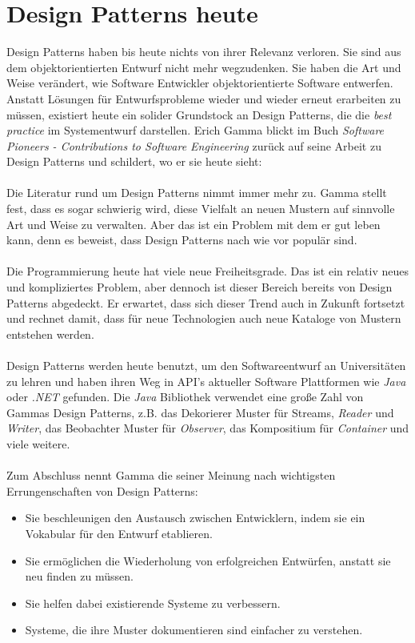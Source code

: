 \documentclass[fontsize=11pt,a4paper,final]{scrreprt}[2003/01/01]
\begin{document}
\chapter{Design Patterns heute}\label{se:Design Patterns heute}
Design Patterns haben bis heute nichts von ihrer Relevanz verloren. Sie sind aus dem objektorientierten Entwurf nicht mehr wegzudenken. Sie haben die Art und Weise verändert, wie Software Entwickler objektorientierte Software entwerfen. Anstatt Lösungen für Entwurfsprobleme wieder und wieder erneut erarbeiten zu müssen, existiert heute ein solider Grundstock an Design Patterns, die die \textit{best practice} im Systementwurf darstellen. Erich Gamma blickt im Buch \textit{Software Pioneers - Contributions to Software Engineering} \cite[S. 688 - 700]{Broy2014} zurück auf seine Arbeit zu Design Patterns und schildert, wo er sie heute sieht: \\ \\
Die Literatur rund um Design Patterns nimmt immer mehr zu. Gamma stellt fest, dass es sogar schwierig wird, diese Vielfalt an neuen Mustern auf sinnvolle Art und Weise zu verwalten. Aber das ist ein Problem mit dem er gut leben kann, denn es beweist, dass Design Patterns nach wie vor populär sind. \\ \\
Die Programmierung heute hat viele neue Freiheitsgrade. Das ist ein relativ neues und kompliziertes Problem, aber dennoch ist dieser Bereich bereits von Design Patterns abgedeckt. Er erwartet, dass sich dieser Trend auch in Zukunft fortsetzt und rechnet damit, dass für neue Technologien auch neue Kataloge von Mustern entstehen werden. \\ \\
Design Patterns werden heute benutzt, um den Softwareentwurf an Universitäten zu lehren und haben ihren Weg in API's aktueller Software Plattformen wie \textit{Java} oder \textit{.NET} gefunden. Die \textit{Java} Bibliothek verwendet eine große Zahl von Gammas Design Patterns, z.B. das Dekorierer Muster für Streams, \textit{Reader} und \textit{Writer}, das Beobachter Muster für \textit{Observer}, das Kompositium für \textit{Container} und viele weitere. \\ \\
Zum Abschluss nennt Gamma die seiner Meinung nach wichtigsten Errungenschaften von Design Patterns:
\begin{itemize}
	\item Sie beschleunigen den Austausch zwischen Entwicklern, indem sie ein Vokabular für den Entwurf etablieren.
	\item Sie ermöglichen die Wiederholung von erfolgreichen Entwürfen, anstatt sie neu finden zu müssen.
	\item Sie helfen dabei existierende Systeme zu verbessern.
	\item Systeme, die ihre Muster dokumentieren sind einfacher zu verstehen.
\end{itemize}
\newpage

\end{document}
